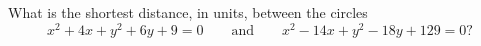 What is the shortest distance, in units, between the circles
\[
x^2+4x+y^2+6y+9=0\qquad\text{and}\qquad x^2-14x+y^2-18y+129=0 ?
\]
